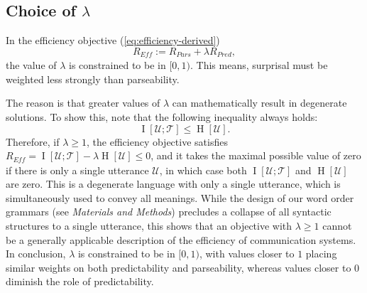 \documentclass[10pt,twoside,lineno]{article}
\newcommand{\key}[1]{\textbf{#1}}
\newcommand{\utterance}{\mathcal{U}}
\newcommand{\tree}{\mathcal{T}}
\begin{document}






\subsection{Choice of $\lambda$}\label{sec:lambda}

In the efficiency objective (\ref{eq:efficiency-derived})
\begin{equation}\label{eq:efficiency}
	R_{\textit{Eff}} := R_{\textit{Pars}} + \lambda R_\textit{Pred},
\end{equation}
the value of $\lambda$ is constrained to be in $[0,1)$.
This means, surprisal must be weighted less strongly than parseability.

The reason is that greater values of $\lambda$ can mathematically result in degenerate solutions.
To show this, note that the following inequality always holds:
\begin{equation}
\operatorname{I}[\utterance; \tree] \leq \operatorname{H}[\utterance].
\end{equation}
Therefore, if $\lambda \geq 1$, the efficiency objective satisfies 
$R_{\textit{Eff}} = \operatorname{I}[\utterance; \tree] - \lambda \operatorname{H}[\utterance] \leq 0$,
and it takes the maximal possible value of zero if there is only a single utterance $\utterance$, in which case both $\operatorname{I}[\utterance; \tree]$ and $\operatorname{H}[\utterance]$ are zero.
This is a degenerate language with only a single utterance, which is simultaneously used to convey all meanings.
While the design of our word order grammars (see \emph{Materials and Methods}) precludes a collapse of all syntactic structures to a single utterance, this shows that an objective with $\lambda \geq 1$ cannot be a generally applicable description of the efficiency of communication systems.
In conclusion, $\lambda$ is constrained to be in $[0,1)$, with values closer to $1$ placing similar weights on both predictability and parseability, whereas values closer to $0$ diminish the role of predictability.
\end{document}
